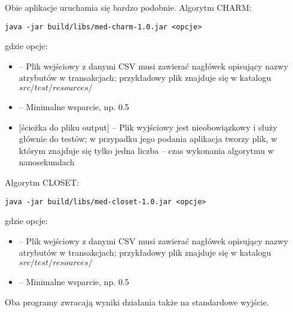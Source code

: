 Obie aplikacje uruchamia się bardzo podobnie. Algorytm CHARM:
\begin{lstlisting}
java -jar build/libs/med-charm-1.0.jar <opcje>
\end{lstlisting}
gdzie opcje:
\begin{itemize}
	\item <ścieżka do pliku z danymi CSV> -- Plik wejściowy z danymi CSV musi zawierać nagłówek opisujący nazwy atrybutów w transakcjach; przykładowy plik znajduje się w katalogu $src/test/resources/$
	\item <minimalne wsparcie relatywne> -- Minimalne wsparcie, np. 0.5
	\item $[$ścieżka do pliku output$]$ -- Plik wyjściowy jest nieobowiązkowy i służy głównie do testów; w przypadku jego podania aplikacja tworzy plik, w którym znajduje się tylko jedna liczba -- czas wykonania algorytmu w nanosekundach
\end{itemize}

Algorytm CLOSET:
\begin{lstlisting}
java -jar build/libs/med-closet-1.0.jar <opcje>
\end{lstlisting}
gdzie opcje:
\begin{itemize}
	\item <ścieżka do pliku z danymi CSV> -- Plik wejściowy z danymi CSV musi zawierać nagłówek opisujący nazwy atrybutów w transakcjach; przykładowy plik znajduje się w katalogu $src/test/resources/$
	\item <minimalne wsparcie relatywne> -- Minimalne wsparcie, np. 0.5
\end{itemize}

Oba programy zwracają wyniki działania także na standardowe wyjście.